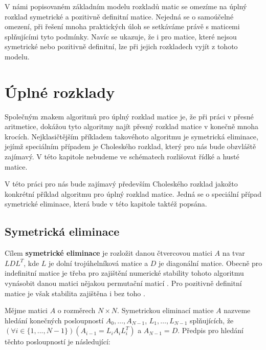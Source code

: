 \documentclass[11pt,american,czech,oneside]{book}
\theoremstyle{plain}
\theoremstyle{definition}
\begin{document}
V námi popisovaném základním modelu rozkladů matic se omezíme na úplný rozklad symetrické a pozitivně definitní matice. Nejedná se o samoúčelné omezení, při řešení mnoha praktických úloh se setkáváme právě s maticemi splňujícími tyto podmínky. Navíc se ukazuje, že i pro matice, které nejsou symetrické nebo pozitivně definitní, lze při jejich rozkladech vyjít z tohoto modelu.

\section{Úplné rozklady}

Společným znakem algoritmů pro úplný rozklad matice je, že při práci v přesné aritmetice, dokážou tyto algoritmy najít přesný rozklad matice v konečně mnoha krocích. Nejklasičtějším příkladem takovéhoto algoritmu je symetrická eliminace, jejímž speciálním případem je Choleského rozklad, který pro nás bude obzvláště zajímavý. V této kapitole nebudeme ve schématech rozlišovat řídké a husté matice.

V této práci pro nás bude zajímavý především Choleského rozklad jakožto konkrétní příklad algoritmu pro úplný rozklad matice. Jedná se o speciální případ symetrické eliminace, která bude v této kapitole taktéž popsána. 

\subsection{Symetrická eliminace}

Cílem \textbf{symetrické eliminace} je rozložit danou čtvercovou matici $A$ na tvar $LDL^T$, kde $L$ je dolní trojúhelníková matice a $D$ je diagonální matice. Obecně pro indefinitní matice je třeba pro zajištění numerické stability tohoto algoritmu vynásobit danou matici nějakou permutační maticí \cite{fomo:67}. Pro pozitivně definitní matice je však stabilita zajištěna i bez toho \cite{wil:68}.

Mějme matici $A$ o rozměrech $N \times N$. Symetrickou eliminací matice $A$ nazveme hledání konečných posloupností $A_0,\ldots,A_{N-1}$, $L_1,\ldots,L_{N-1}$ splňujících, že $\left(\forall i \in \{1,...,N-1\}\right)\left(A_{i-1}=L_i A_i L_i^T \right)$ a $A_{N-1}=D$.
Předpis pro hledání těchto posloupností je následující:
\end{document}
